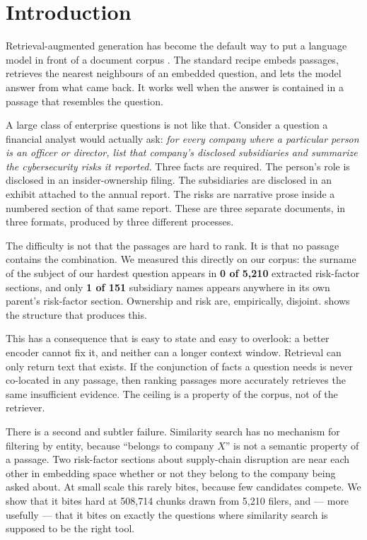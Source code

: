 \section{Introduction}
\label{sec:intro}

Retrieval-augmented generation has become the default way to put a language model
in front of a document corpus \citep{lewis2020rag,gao2023ragsurvey}. The standard
recipe embeds passages, retrieves the nearest neighbours of an embedded question,
and lets the model answer from what came back. It works well when the answer is
contained in a passage that resembles the question.

A large class of enterprise questions is not like that. Consider a question a
financial analyst would actually ask: \emph{for every company where a particular
person is an officer or director, list that company's disclosed subsidiaries and
summarize the cybersecurity risks it reported.} Three facts are required. The
person's role is disclosed in an insider-ownership filing. The subsidiaries are
disclosed in an exhibit attached to the annual report. The risks are narrative
prose inside a numbered section of that same report. These are three separate
documents, in three formats, produced by three different processes.

The difficulty is not that the passages are hard to rank. It is that no passage
contains the combination. We measured this directly on our corpus: the surname of
the subject of our hardest question appears in \textbf{0 of 5{,}210} extracted
risk-factor sections, and only \textbf{1 of 151} subsidiary names appears anywhere
in its own parent's risk-factor section. Ownership and risk are, empirically,
disjoint.  shows the structure that produces this.

This has a consequence that is easy to state and easy to overlook: a better
encoder cannot fix it, and neither can a longer context window. Retrieval can
only return text that exists. If the conjunction of facts a question needs is
never co-located in any passage, then ranking passages more accurately retrieves
the same insufficient evidence. The ceiling is a property of the corpus, not of
the retriever.

There is a second and subtler failure. Similarity search has no mechanism for
filtering by entity, because ``belongs to company $X$'' is not a semantic property
of a passage. Two risk-factor sections about supply-chain disruption are near each
other in embedding space whether or not they belong to the company being asked
about. At small scale this rarely bites, because few candidates compete. We show
that it bites hard at 508{,}714 chunks drawn from 5{,}210 filers, and --- more
usefully --- that it bites on exactly the questions where similarity search is
supposed to be the right tool.

